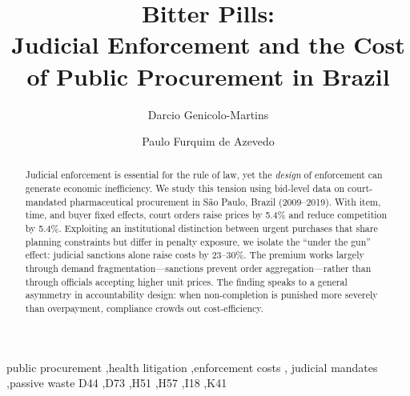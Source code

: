 \documentclass[review,12pt,authoryear]{elsarticle}
\begin{document}
\begin{frontmatter}

\title{Bitter Pills:\\ Judicial Enforcement and the Cost of Public Procurement in Brazil%
}

\author[INSPER]{Darcio Genicolo-Martins}
\author[INSPER]{Paulo Furquim de Azevedo}
\address[INSPER]{Insper Institute of Education and Research,
  Rua Quat\'a 300, S\~ao Paulo, SP 04546-042, Brazil}

\begin{abstract}
Judicial enforcement is essential for the rule of law, yet the
\emph{design} of enforcement can generate economic inefficiency.
We study this tension using bid-level data on court-mandated
pharmaceutical procurement in S\~ao Paulo, Brazil (2009--2019).
With item, time, and buyer fixed effects, court orders raise
prices by 5.4\% and reduce competition by 5.4\%. Exploiting an
institutional distinction between urgent purchases that share
planning constraints but differ in penalty exposure, we isolate
the ``under the gun'' effect: judicial sanctions alone raise
costs by 23--30\%. The premium works largely through demand
fragmentation---sanctions prevent order aggregation---rather
than through officials accepting higher unit prices. The finding
speaks to a general asymmetry in accountability design: when
non-completion is punished more severely than overpayment,
compliance crowds out cost-efficiency.
\end{abstract}

\begin{keyword}
public procurement \sep health litigation \sep enforcement costs \sep
judicial mandates \sep passive waste
\JEL D44 \sep D73 \sep H51 \sep H57 \sep I18 \sep K41
\end{keyword}

\end{frontmatter}











\end{document}
